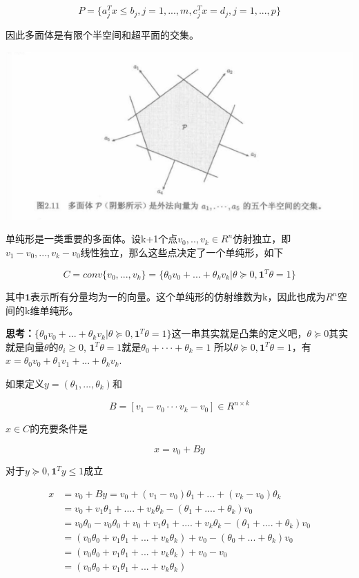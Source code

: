 \documentclass{ctexart}
\begin{document}
	\[P = \{a_j^Tx \leq b_j, j = 1,...,m, c_j^Tx=d_j, j=1,...,p\}\]
	
	因此多面体是有限个半空间和超平面的交集。
	
	\includegraphics[width=1\linewidth]{pic/pic2_11}
	
	单纯形是一类重要的多面体。设k+1个点\(v_0,..,v_k \in R^n\)仿射独立，即\(v_1-v_0,...,v_k-v_0\)线性独立，那么这些点决定了一个单纯形，如下
	
	\[C = conv\{v_0,...,v_k\}=\{\theta_0v_0+...+\theta_kv_k| \theta \succeq 0, \bm{1}^T\theta = 1\}\]
	
	其中\(\bm{1}\)表示所有分量均为一的向量。这个单纯形的仿射维数为k，因此也成为\(R^n\)空间的k维单纯形。
	
	\textbf{思考：}\(\{\theta_0v_0+...+\theta_kv_k| \theta \succeq 0, \bm{1}^T\theta = 1\}\)这一串其实就是凸集的定义吧，\(\theta \succeq 0\)其实就是向量\(\theta\)的\(\theta_i \geq 0\), \(\bm{1}^T\theta = 1\)就是\(\theta_0+···+\theta_k = 1\)
	所以\(\theta \succeq 0, \bm{1}^T\theta = 1\)，有\(x=\theta_0v_0+\theta_1v_1+...+\theta_kv_k\).
	
	如果定义\(y=(\theta_1,...,\theta_k)\)和
	
	\[B = [v_1-v_0 ··· v_k-v_0] \in R^{n\times k}\]
	
	\(x \in C\)的充要条件是
	
	\[x = v_0 + By\]	
	
	对于\(y \succeq 0, \bm{1}^Ty \leq 1\)成立
	
	\begin{align*}
	x & = v_0 + By = v_0 + (v_1-v_0)\theta_1+...+(v_k-v_0)\theta_k \\
	   & = v_0 + v_1\theta_1 +....+ v_k\theta_k - (\theta_1+....+\theta_k)v_0 \\
	   & =v_0\theta_0 - v_0\theta_0 + v_0 + v_1\theta_1 +....+ v_k\theta_k - (\theta_1+....+\theta_k)v_0 \\
	   & =(v_0\theta_0+v_1\theta_1+...+v_k\theta_k) + v_0 - (\theta_0+...+\theta_k)v_0 \\
	   & = (v_0\theta_0+v_1\theta_1+...+v_k\theta_k) + v_0 -v_0 \\
	   & = (v_0\theta_0+v_1\theta_1+...+v_k\theta_k)
	\end{align*}
\end{document}
